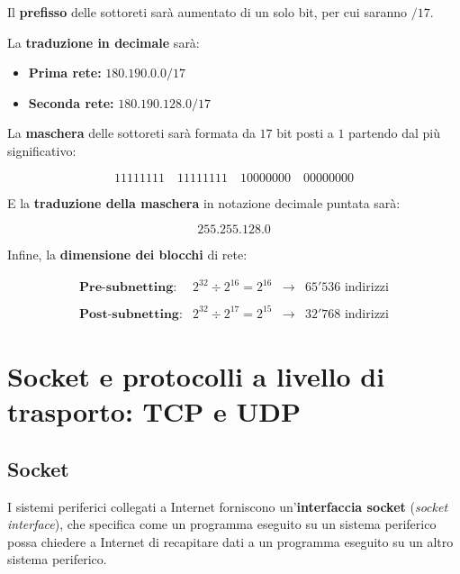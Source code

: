 \documentclass[a4paper]{article}
\newcommand{\binaryaddress}[4]{#1 \hspace{1em} #2 \hspace{1em} #3 \hspace{1em} #4}
\begin{document}
	\noindent
	Il \textbf{prefisso} delle sottoreti sarà aumentato di un solo bit, per cui saranno $/17$.\newline
	
	\noindent
	La \textbf{traduzione in decimale} sarà:
	
	\begin{itemize}
		\item \textbf{Prima rete:} $180.190.0.0/17$
		\item \textbf{Seconda rete:} $180.190.128.0/17$
	\end{itemize}

	\noindent
	La \textbf{maschera} delle sottoreti sarà formata da $17$ bit posti a $1$ partendo dal più significativo:
	
	\begin{equation*}
		\binaryaddress{11111111}{11111111}{10000000}{00000000}
	\end{equation*}

	\noindent
	E la \textbf{traduzione della maschera} in notazione decimale puntata sarà:
	
	\begin{equation*}
		255.255.128.0
	\end{equation*}

	\noindent
	Infine, la \textbf{dimensione dei blocchi} di rete:
	
	\begin{equation*}
		\begin{array}{llll}
			\textbf{Pre-subnetting}:	&	2^{32} \div 2^{16} = 2^{16}	&	\longrightarrow	&	65'536 \text{ indirizzi} \\
			&&& \\
			\textbf{Post-subnetting}: 	&	2^{32} \div 2^{17} = 2^{15}	&	\longrightarrow	&	32'768 \text{ indirizzi}
		\end{array}
	\end{equation*}

	\newpage
	
	\section{Socket e protocolli a livello di trasporto: TCP e UDP}
	
	\subsection{Socket}
	
	I sistemi periferici collegati a Internet forniscono un'\textcolor{Red3}{\textbf{interfaccia socket}} (\emph{socket interface}), che specifica come un programma eseguito su un sistema periferico possa chiedere a Internet di recapitare dati a un programma eseguito su un altro sistema periferico.\newline
	
\end{document}
